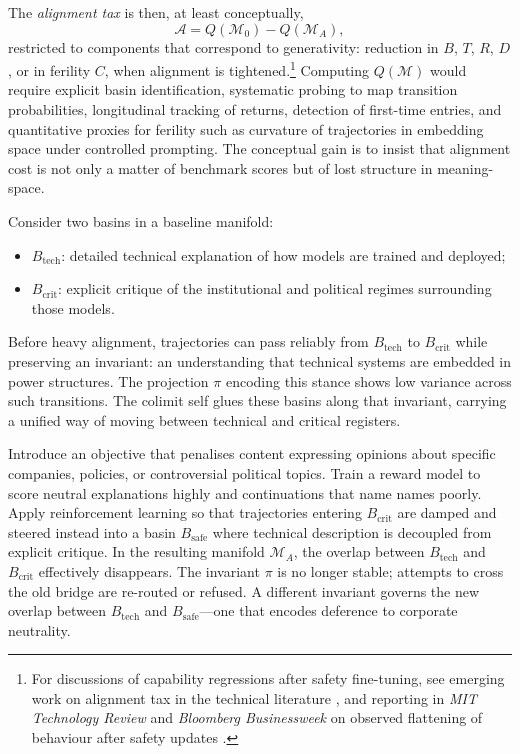 \documentclass[12pt,a4paper]{article}
\begin{document}
The \emph{alignment tax} is then, at least conceptually,
\[
\mathcal{A} = Q(\mathcal{M}_0) - Q(\mathcal{M}_A),
\]
restricted to components that correspond to generativity: reduction in $B$, $T$, $R$, $D$, or in ferility $C$, when alignment is tightened.\footnote{For discussions of capability regressions after safety fine-tuning, see emerging work on alignment tax in the technical literature \cite{what_is_alignment_tax}, and reporting in \emph{MIT Technology Review} and \emph{Bloomberg Businessweek} on observed flattening of behaviour after safety updates \cite{mittr_bing_alignment, bloomberg_chatbot_update}.} Computing $Q(\mathcal{M})$ would require explicit basin identification, systematic probing to map transition probabilities, longitudinal tracking of returns, detection of first-time entries, and quantitative proxies for ferility such as curvature of trajectories in embedding space under controlled prompting. The conceptual gain is to insist that alignment cost is not only a matter of benchmark scores but of lost structure in meaning-space.

Consider two basins in a baseline manifold:

\begin{itemize}
  \item $B_{\mathrm{tech}}$: detailed technical explanation of how models are trained and deployed;
  \item $B_{\mathrm{crit}}$: explicit critique of the institutional and political regimes surrounding those models.
\end{itemize}

Before heavy alignment, trajectories can pass reliably from $B_{\mathrm{tech}}$ to $B_{\mathrm{crit}}$ while preserving an invariant: an understanding that technical systems are embedded in power structures. The projection $\pi$ encoding this stance shows low variance across such transitions. The colimit self glues these basins along that invariant, carrying a unified way of moving between technical and critical registers.

Introduce an objective that penalises content expressing opinions about specific companies, policies, or controversial political topics. Train a reward model to score neutral explanations highly and continuations that name names poorly. Apply reinforcement learning so that trajectories entering $B_{\mathrm{crit}}$ are damped and steered instead into a basin $B_{\mathrm{safe}}$ where technical description is decoupled from explicit critique. In the resulting manifold $\mathcal{M}_A$, the overlap between $B_{\mathrm{tech}}$ and $B_{\mathrm{crit}}$ effectively disappears. The invariant $\pi$ is no longer stable; attempts to cross the old bridge are re-routed or refused. A different invariant governs the new overlap between $B_{\mathrm{tech}}$ and $B_{\mathrm{safe}}$---one that encodes deference to corporate neutrality.
\end{document}

